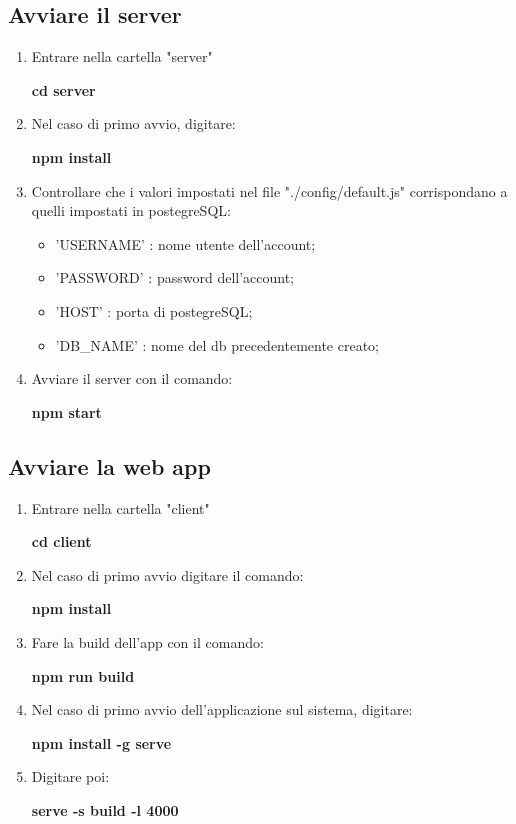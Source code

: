 \subsection{Avviare il server}
\begin{enumerate}
\item Entrare nella cartella "server"
	\begin{center}
			\textcolor{coloreRosso}{\textbf{cd server}}
 	\end{center}
\item Nel caso di primo avvio, digitare:
	\begin{center}
			\textcolor{coloreRosso}{\textbf{npm install}}
 	\end{center}

\newpage 	
 	
\item Controllare che i valori impostati nel file "./config/default.js" corrispondano a quelli impostati in postegreSQL:
\begin{itemize}
\item 'USER\underline{}NAME' : nome utente dell'account;
\item 'PASSWORD' : password dell'account;
\item 'HOST' : porta di postegreSQL;
\item 'DB\_NAME' :  nome del db precedentemente creato;
\end{itemize}
\item Avviare il server con il comando:
	\begin{center}
			\textcolor{coloreRosso}{\textbf{npm start}}
 	\end{center}
\end{enumerate}
\subsection{Avviare la web app}
\begin{enumerate}
\item Entrare nella cartella "client"
	\begin{center}
			\textcolor{coloreRosso}{\textbf{cd client}}
 	\end{center}
\item Nel caso di primo avvio digitare il comando:
		\begin{center}
			\textcolor{coloreRosso}{\textbf{npm install}}
 		\end{center}
\item Fare la build dell'app con il comando:
		\begin{center}
			\textcolor{coloreRosso}{\textbf{npm run build}}
 		\end{center}
\item Nel caso di primo avvio dell’applicazione sul sistema, digitare:
		\begin{center}
			\textcolor{coloreRosso}{\textbf{npm install -g serve}}
 		\end{center}	     
\item Digitare poi:
		\begin{center}
			\textcolor{coloreRosso}{\textbf{serve -s build -l 4000}}
 		\end{center}		
\end{enumerate}

